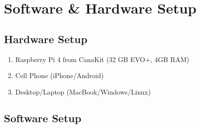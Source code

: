 \section{Software \& Hardware Setup}	\label{sec:setup}
	\subsection{Hardware Setup}	\label{subsec:hardware}
		\begin{enumerate}
			\item Raspberry Pi 4 from CanaKit (32 GB EVO+, 4GB RAM)
			\item Cell Phone (iPhone/Android)
			\item Desktop/Laptop (MacBook/Windows/Linux)
		\end{enumerate}
	\subsection{Software Setup}	\label{subsec:software}

